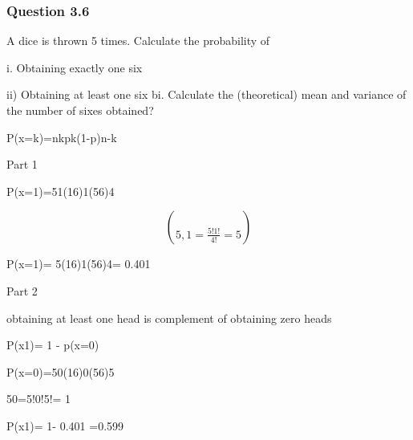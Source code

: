 
\subsubsection{Question 3.6}

A dice is thrown 5 times. Calculate the probability of

i.
Obtaining exactly one six


ii)    Obtaining at least one six
bi.
Calculate the (theoretical) mean and variance of the number of sixes obtained?



P(x=k)=nkpk(1-p)n-k






Part 1 


P(x=1)=51(16)1(56)4


\[ \choose{5,1}= \frac{5!1!}{4!}= 5\]


P(x=1)= 5(16)1(56)4= 0.401 




Part 2


obtaining at least one head is complement of obtaining zero heads


P(x1)= 1 - p(x=0)



P(x=0)=50(16)0(56)5


50=5!0!5!= 1


P(x1)= 1- 0.401 =0.599 

